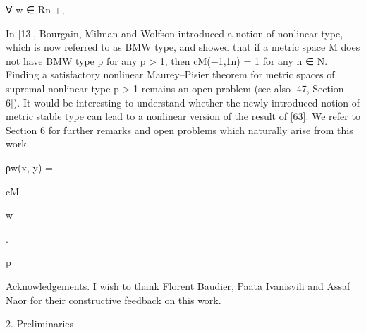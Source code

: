 ∀ w ∈ Rn
+,

In [13], Bourgain, Milman and Wolfson introduced a notion of nonlinear type, which is now
referred to as BMW type, and showed that if a metric space M does not have BMW type p for
any p > 1, then cM({−1,1}n) = 1 for any n ∈ N. Finding a satisfactory nonlinear Maurey–Pisier
theorem for metric spaces of supremal nonlinear type p > 1 remains an open problem (see also
[47, Section 6]). It would be interesting to understand whether the newly introduced notion
of metric stable type can lead to a nonlinear version of the result of [63]. We refer to Section 6
for further remarks and open problems which naturally arise from this work.

ρw(x, y) =

cM

w

.

p

Acknowledgements. I wish to thank Florent Baudier, Paata Ivanisvili and Assaf Naor for their
constructive feedback on this work.

2. Preliminaries

